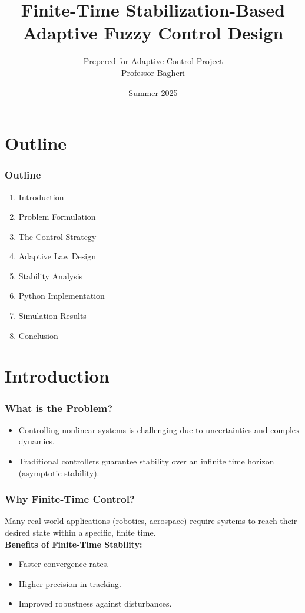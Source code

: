 \documentclass[18p]{beamer}
\title{\myfont Finite-Time Stabilization-Based \\Adaptive Fuzzy Control Design}
\author{Prepered for Adaptive Control Project\\ Professor Bagheri}
\date{Summer 2025}
\institute{Presentation \\Murtaza Asaadi}
\begin{document}
\begin{frame}[plain,t]
	\titlepage
\end{frame}

\section{Outline}
\begin{frame}%
	\frametitle{Outline}
	\begin{enumerate}
		\item Introduction
		\item Problem Formulation
		\item The Control Strategy
		\item Adaptive Law Design
		\item Stability Analysis
		\item Python Implementation
		\item Simulation Results
		\item Conclusion
	\end{enumerate}
\end{frame}

\section{Introduction}
\begin{frame}
	\frametitle{What is the Problem?}
		\begin{itemize}
		\item Controlling nonlinear systems is challenging due to uncertainties and complex dynamics.
		\item Traditional controllers guarantee stability over an infinite time horizon (asymptotic stability).
	\end{itemize}
\end{frame}

\begin{frame}
	\frametitle{Why Finite-Time Control?}
	Many real-world applications (robotics, aerospace) require systems to reach their desired state within a specific, finite time.\\
	\vspace*{2\baselineskip}
	\textbf{Benefits of Finite-Time Stability:}
	\begin{itemize}
		\item Faster convergence rates.
		\item Higher precision in tracking.
		\item Improved robustness against disturbances.
	\end{itemize}
\end{frame}
\end{document}
